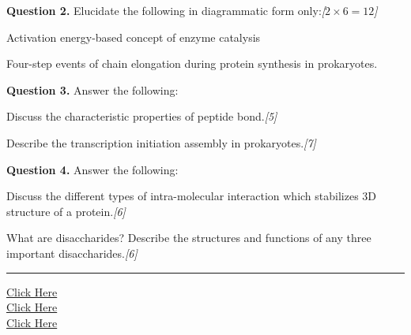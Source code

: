 \documentclass[11pt,a4paper]{article}
\newcommand{\pts}[1]{\hfill   \textit{[#1]}}
\begin{document}
\medskip


\noindent   \textbf{Question 2.} Elucidate the following in diagrammatic form only:\pts{$2  \times 6 = 12$}

\begin{parts}
  \item Activation energy-based concept of enzyme catalysis
  \item Four-step events of chain elongation during protein synthesis in prokaryotes.
\end{parts}

\medskip


\noindent   \textbf{Question 3.} Answer the following:

\begin{parts}
  \item Discuss the characteristic properties of peptide bond.\pts{5}
  \item Describe the transcription initiation assembly in prokaryotes.\pts{7}
\end{parts}

\medskip


\noindent   \textbf{Question 4.} Answer the following:

\begin{parts}
  \item Discuss the different types of intra-molecular interaction which stabilizes 3D structure of a protein.\pts{6}
  \item What are disaccharides? Describe the structures and functions of any three important disaccharides.\pts{6}
\end{parts}

\vfill
\rule{\linewidth}{0.4pt}

\begin{center}\small
\href{https://bhu-exam.vercel.app/}{Click Here}\\[4pt]\href{https://me-aryan.vercel.app/}{Click Here}\\[4pt]\href{https://quashan-me.vercel.app/}{Click Here}
\end{center}
\end{document}
